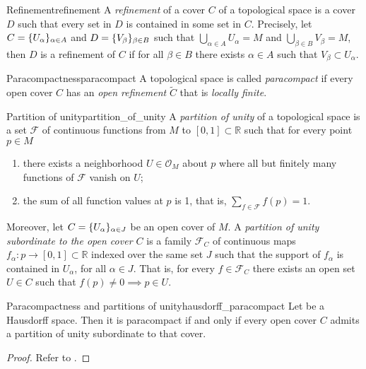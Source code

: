 \begin{definition}{Refinement}{refinement}
    A \emph{refinement} of a cover \(C\) of a topological space  is a cover \(D\) such that every set in \(D\) is contained in some set in \(C\). Precisely, let \(C = \{U_\alpha\}_{\alpha \in A}\) and \(D = \{V_\beta\}_{\beta \in B}\) such that \(\bigcup_{\alpha \in A} U_\alpha = M\) and \(\bigcup_{\beta \in B} V_\beta = M\), then \(D\) is a refinement of \(C\) if for all \(\beta \in B\) there exists \(\alpha \in A\) such that \(V_\beta \subset U_\alpha\).
\end{definition}

\begin{definition}{Paracompactness}{paracompact}
    A topological space  is called \emph{paracompact} if every open cover \(C\) has an \emph{open refinement} \(\tilde{C}\) that is \emph{locally finite}.
\end{definition}

\begin{definition}{Partition of unity}{partition_of_unity}
    A \emph{partition of unity} of a topological space  is a set \(\mathcal{F}\) of continuous functions from \(M\) to \([0,1]\subset\mathbb{R}\) such that for every point \(p \in M\)
    \begin{enumerate}[label=(\alph*)]
        \item there exists a neighborhood \(U \in \mathcal{O}_M\) about \(p\) where all but finitely many functions of \(\mathcal{F}\) vanish on \(U\);
        \item the sum of all function values at \(p\) is 1, that is, \(\sum_{f \in \mathcal{F}} f(p) = 1\).
    \end{enumerate}

    Moreover, let \(C = \{U_\alpha\}_{\alpha \in J}\) be an open cover of \(M\). A \emph{partition of unity subordinate to the open cover \(C\)} is a family \(\mathcal{F}_C\) of continuous maps \(f_\alpha : p \to [0,1] \subset\mathbb{R}\) indexed over the same set \(J\) such that the support of \(f_\alpha\) is contained in \(U_\alpha\), for all \(\alpha \in J\). That is, for every \(f \in \mathcal{F}_C\) there exists an open set \(U \in C\) such that \(f(p) \neq 0 \implies p \in U\).
\end{definition}

\begin{theorem}{Paracompactness and partitions of unity}{hausdorff_paracompact}
    Let  be a Hausdorff space. Then it is paracompact if and only if every open cover \(C\) admits a partition of unity subordinate to that cover.
\end{theorem}
\begin{proof}
    Refer to \cite{munkres_topology}.
\end{proof}
